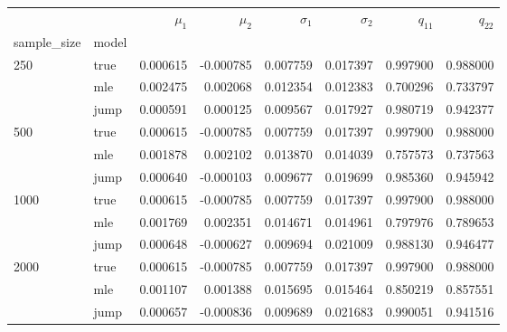 \begin{tabular}{llrrrrrr}
\toprule
     &      &   $\mu_1$ &   $\mu_2$ &  $\sigma_1$ &  $\sigma_2$ &    $q_11$ &    $q_22$ \\
sample_size & model &           &           &             &             &           &           \\
\midrule
250  & true &  0.000615 & -0.000785 &    0.007759 &    0.017397 &  0.997900 &  0.988000 \\
     & mle &  0.002475 &  0.002068 &    0.012354 &    0.012383 &  0.700296 &  0.733797 \\
     & jump &  0.000591 &  0.000125 &    0.009567 &    0.017927 &  0.980719 &  0.942377 \\
500  & true &  0.000615 & -0.000785 &    0.007759 &    0.017397 &  0.997900 &  0.988000 \\
     & mle &  0.001878 &  0.002102 &    0.013870 &    0.014039 &  0.757573 &  0.737563 \\
     & jump &  0.000640 & -0.000103 &    0.009677 &    0.019699 &  0.985360 &  0.945942 \\
1000 & true &  0.000615 & -0.000785 &    0.007759 &    0.017397 &  0.997900 &  0.988000 \\
     & mle &  0.001769 &  0.002351 &    0.014671 &    0.014961 &  0.797976 &  0.789653 \\
     & jump &  0.000648 & -0.000627 &    0.009694 &    0.021009 &  0.988130 &  0.946477 \\
2000 & true &  0.000615 & -0.000785 &    0.007759 &    0.017397 &  0.997900 &  0.988000 \\
     & mle &  0.001107 &  0.001388 &    0.015695 &    0.015464 &  0.850219 &  0.857551 \\
     & jump &  0.000657 & -0.000836 &    0.009689 &    0.021683 &  0.990051 &  0.941516 \\
\bottomrule
\end{tabular}
